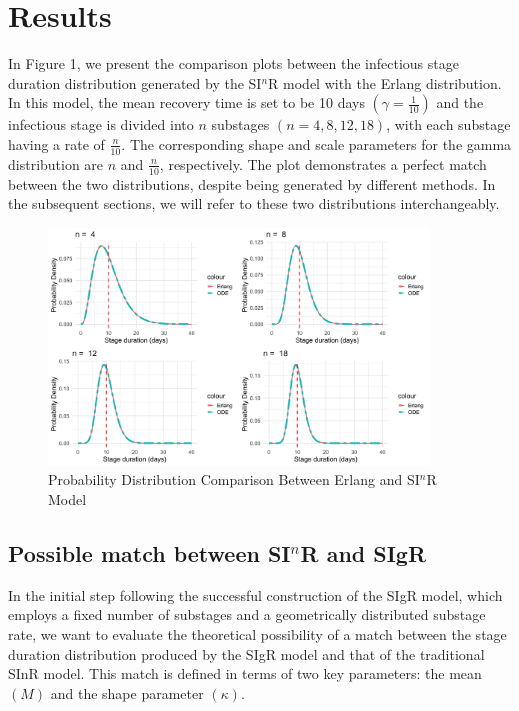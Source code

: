 \documentclass[12pt]{article}
\begin{document}
\section{Results}
In Figure 1, we present the comparison plots between the infectious stage duration distribution generated by the SI$^n$R model with the Erlang distribution. In this model, the mean recovery time is set to be 10 days $(\gamma = \frac{1}{10})$ and the infectious stage is divided into $n$ substages $(n = 4, 8, 12, 18)$, with each substage having a rate of $\frac{n}{10}$. The corresponding shape and scale parameters for the gamma distribution are $n$ and $\frac{n}{10}$, respectively. The plot demonstrates a perfect match between the two distributions, despite being generated by different methods. In the subsequent sections, we will refer to these two distributions interchangeably.
\begin{figure}[h]
    \centering
    \includegraphics[width= 0.9\textwidth]{4.png}
    \caption{Probability Distribution Comparison Between Erlang and SI$^n$R Model}
\end{figure}

\subsection{Possible match between SI$^n$R and SIgR}
In the initial step following the successful construction of the SIgR model, which employs a fixed number of substages and a geometrically distributed substage rate, we want to evaluate the theoretical possibility of a match between the stage duration distribution produced by the SIgR model and that of the traditional SInR model. This match is defined in terms of two key parameters: the mean $(M)$ and the shape parameter $(\kappa)$.
\end{document}
